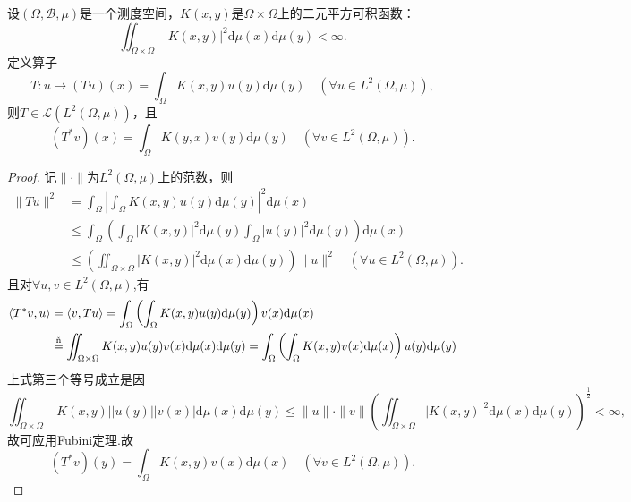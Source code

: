 \documentclass[../../main.tex]{subfiles}%
\begin{document}
\begin{example}
设$(\Omega,\mathscr{B},\mu)$是一个测度空间，$K(x,y)$是$\Omega\times\Omega$上的二元平方可积函数：
\[
\iint_{\Omega\times\Omega}|K(x,y)|^2\mathrm{d}\mu(x)\mathrm{d}\mu(y)<\infty.
\]
定义算子
\[
T:u\mapsto (Tu)(x)=\int_{\Omega}K(x,y)u(y)\mathrm{d}\mu(y)\quad (\forall u\in L^2(\Omega,\mu)),
\]
则$T\in\mathscr{L}(L^2(\Omega,\mu))$，且
\[
(T^*v)(x)=\int_{\Omega}K(y,x)v(y)\mathrm{d}\mu(y)\quad (\forall v\in L^2(\Omega,\mu)).
\]
\end{example}

\begin{proof}
记$\|\cdot\|$为$L^2(\Omega,\mu)$上的范数，则
\begin{align*}
\|Tu\|^2&=\int_{\Omega}\left|\int_{\Omega}K(x,y)u(y)\mathrm{d}\mu(y)\right|^2\mathrm{d}\mu(x)\\
&\leqslant\int_{\Omega}\left(\int_{\Omega}|K(x,y)|^2\mathrm{d}\mu(y)\int_{\Omega}|u(y)|^2\mathrm{d}\mu(y)\right)\mathrm{d}\mu(x)\\
&\leqslant\left(\iint_{\Omega\times\Omega}|K(x,y)|^2\mathrm{d}\mu(x)\mathrm{d}\mu(y)\right)\|u\|^2\quad (\forall u\in L^2(\Omega,\mu)).
\end{align*}
且对$\forall u,v\in L^2(\Omega,\mu)$,有
\begin{align*}
\langle T^*v,u\rangle&=\langle v,Tu\rangle
=\int_{\Omega}\left(\int_{\Omega}K(x,y)u(y)\mathrm{d}\mu(y)\right)v(x)\mathrm{d}\mu(x)\\
&\stackrel{\one}{=}\iint_{\Omega\times\Omega}K(x,y)u(y)v(x)\mathrm{d}\mu(x)\mathrm{d}\mu(y)
=\int_{\Omega}\left(\int_{\Omega}K(x,y)v(x)\mathrm{d}\mu(x)\right)u(y)\mathrm{d}\mu(y)
\end{align*}
上式第三个等号成立是因
\[
\iint_{\Omega\times\Omega}|K(x,y)||u(y)||v(x)|\mathrm{d}\mu(x)\mathrm{d}\mu(y)\leqslant\|u\|\cdot\|v\|\left(\iint_{\Omega\times\Omega}|K(x,y)|^2\mathrm{d}\mu(x)\mathrm{d}\mu(y)\right)^{\frac{1}{2}}<\infty,
\]
故可应用Fubini定理.故
\[
(T^*v)(y)=\int_{\Omega}K(x,y)v(x)\mathrm{d}\mu(x)\quad (\forall v\in L^2(\Omega,\mu)).
\]
\end{proof}
\end{document}
